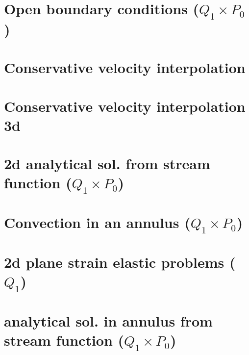 \documentclass[a4paper,11pt]{report}
\begin{document}
\chapter{Open boundary conditions ($Q_1\times P_0$)\label{f29}} %

\chapter{Conservative velocity interpolation \label{f30}} %

\chapter{Conservative velocity interpolation 3d \label{f31}} %

\chapter{2d analytical sol. from stream function ($Q_1\times P_0$)\label{f32}} %

\chapter{Convection in an annulus  ($Q_1\times P_0$)  \label{f33}} %

\chapter{2d plane strain elastic problems ($Q_1$)\label{f34}} %

\chapter{analytical sol. in annulus from stream function ($Q_1\times P_0$) \label{f35}} %
\end{document}
